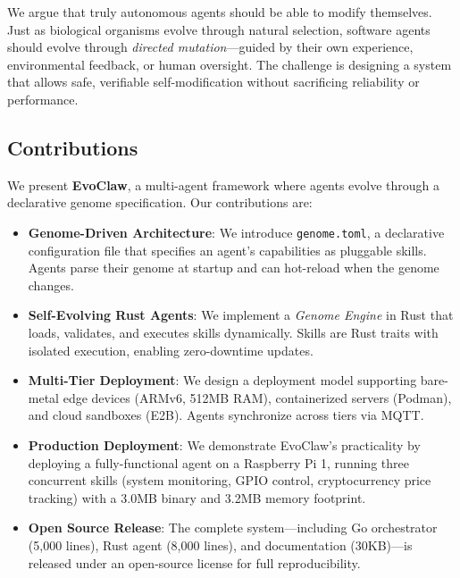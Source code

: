 \documentclass{article}
\begin{document}
We argue that truly autonomous agents should be able to modify themselves. Just as biological organisms evolve through natural selection, software agents should evolve through \textit{directed mutation}—guided by their own experience, environmental feedback, or human oversight. The challenge is designing a system that allows safe, verifiable self-modification without sacrificing reliability or performance.

\subsection{Contributions}

We present \textbf{EvoClaw}, a multi-agent framework where agents evolve through a declarative genome specification. Our contributions are:

\begin{itemize}
    \item \textbf{Genome-Driven Architecture}: We introduce \texttt{genome.toml}, a declarative configuration file that specifies an agent's capabilities as pluggable skills. Agents parse their genome at startup and can hot-reload when the genome changes.
    
    \item \textbf{Self-Evolving Rust Agents}: We implement a \textit{Genome Engine} in Rust that loads, validates, and executes skills dynamically. Skills are Rust traits with isolated execution, enabling zero-downtime updates.
    
    \item \textbf{Multi-Tier Deployment}: We design a deployment model supporting bare-metal edge devices (ARMv6, 512MB RAM), containerized servers (Podman), and cloud sandboxes (E2B). Agents synchronize across tiers via MQTT.
    
    \item \textbf{Production Deployment}: We demonstrate EvoClaw's practicality by deploying a fully-functional agent on a Raspberry Pi 1, running three concurrent skills (system monitoring, GPIO control, cryptocurrency price tracking) with a 3.0MB binary and 3.2MB memory footprint.
    
    \item \textbf{Open Source Release}: The complete system—including Go orchestrator (5,000 lines), Rust agent (8,000 lines), and documentation (30KB)—is released under an open-source license for full reproducibility.
\end{itemize}
\end{document}
